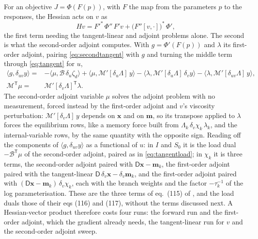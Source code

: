 \documentclass[11pt,a4paper]{article}
\numberwithin{equation}{section}
\begin{document}
For an objective $J = \Phi(F(p))$, with $F$ the map from the parameters $p$ to
the responses, the Hessian acts on $v$ as
\begin{equation}
H v = F'^{*}\,\Phi''\,F' v + \big(F''[v,\cdot]\big)^{*}\,\Phi',
\label{eq:hessian}
\end{equation}
the first term needing the tangent-linear and adjoint problems alone. The
second is what the second-order adjoint computes. With $g = \Phi'(F(p))$ and
$\lambda$ its first-order adjoint, pairing \eqref{eq:secondtangent} with $g$
and turning the middle term through \eqref{eq:tangent} for $u$,
\begin{equation}
\begin{aligned}
\langle g, \delta_{uv}y\rangle
 ={}& -\langle\mu, \mathcal{B}\,\delta_{u}\zeta_{d}\rangle
 + \langle\mu, \mathcal{M}'[\delta_{u}\Lambda]\,y\rangle
 - \langle\lambda, \mathcal{M}'[\delta_{u}\Lambda]\,\delta_{v}y\rangle
 - \langle\lambda, \mathcal{M}'[\delta_{uv}\Lambda]\,y\rangle,\\
\mathcal{M}^{\mathsf T}\mu ={}& \mathcal{M}'[\delta_{v}\Lambda]^{\mathsf T}\lambda.
\end{aligned}
\label{eq:secondadjoint}
\end{equation}
The second-order adjoint variable $\mu$ solves the adjoint problem with no
measurement, forced instead by the first-order adjoint and $v$'s viscosity
perturbation: $\mathcal{M}'[\delta_{v}\Lambda]\,y$ depends on $\mathbf{x}$ and
on $\mathbf{m}$, so its transpose applied to $\lambda$ forces the equilibrium
rows, like a memory force built from
$\Lambda_{k}\,\delta_{v}\chi_{k}\,\lambda_{k}$, and the internal-variable
rows, by the same quantity with the opposite sign. Reading off the components
of $\langle g,\delta_{uv}y\rangle$ as a functional of $u$: in $I$ and $S_{0}$
it is the load dual $-\mathcal{B}^{\mathsf T}\mu$ of the second-order adjoint,
paired as in \eqref{eq:tangentload}; in $\chi_{k}$ it is three terms, the
second-order adjoint paired with $\mathsf{D}\mathbf{x}-\mathbf{m}_{k}$, the
first-order adjoint paired with the tangent-linear
$\mathsf{D}\,\delta_{v}\mathbf{x}-\delta_{v}\mathbf{m}_{k}$, and the
first-order adjoint paired with
$(\mathsf{D}\mathbf{x}-\mathbf{m}_{k})\,\delta_{v}\chi_{k}$, each with the
branch weights and the factor $-\tau_{k}^{-1}$ of the log parameterisation.
These are the three terms of eq.~(115) of \citet{YuEtAl2025}, and the load
duals those of their eqs (116) and (117), without the terms discussed next.
A Hessian-vector product therefore costs four runs: the forward run and the
first-order adjoint, which the gradient already needs, the tangent-linear run
for $v$ and the second-order adjoint sweep.
\end{document}

